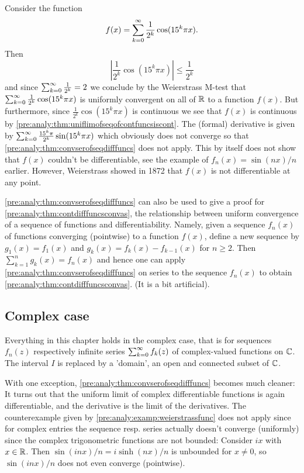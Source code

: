 \documentclass[10pt, a4paper]{article}
\newcommand{\infsumo}{\infsum[k = 0]}
\begin{document}
\begin{example}\label{pre:analy:examp:weierstrassfunc}
    Consider the function
    \[
    f(x) = \infsumo\frac{1}{2 ^ k}\cos(15 ^ k\pi x).
    \]
    Then
    \[
    \left|\frac{1}{2 ^ k}\cos(15 ^ k\pi x)\right| \leq \frac{1}{2 ^ k}
    \]
    and since $\infsumo\frac{1}{2 ^ k} = 2$ we conclude by the Weierstrass M-test that $\infsumo\frac{1}{2 ^ k}\cos(15 ^ k\pi x)$ is uniformly convergent on all of $\mathbb{R}$ to a function $f(x)$.
    But furthermore,
    since $\frac{1}{2 ^ k}\cos(15 ^ k\pi x)$ is continuous we see that $f(x)$ is continuous by \autoref{pre:analy:thm:uniflimofseqofcontfuncsiscont}.
    The
    (formal)
    derivative is given by $\infsumo\frac{15 ^ k\pi}{2 ^ k}\sin(15 ^ k\pi x)$ which obviously does not converge so that \autoref{pre:analy:thm:convserofseqdifffuncs} does not apply.
    This by itself does not show that $f(x)$ couldn't be differentiable,
    see the example of $f_n(x) = \sin(nx) / n$ earlier.
    However,
    Weierstrass showed in 1872 that $f(x)$ is not differentiable at any point.
\end{example}

\begin{remark}
    \autoref{pre:analy:thm:convserofseqdifffuncs} can also be used to give a proof for \autoref{pre:analy:thm:contdifffuncsconvas},
    the relationship between uniform convergence of a sequence of functions and differentiability.
    Namely,
    given a sequence $f_n(x)$ of functions converging
    (pointwise)
    to a function $f(x)$,
    define a new sequence by $g_1(x) = f_1(x)$ and $g_k(x) = f_k(x) - f_{k - 1}(x)$ for $n \geq 2$.
    Then $\sum_{k = 1}^{n}g_k(x) = f_n(x)$ and hence one can apply \autoref{pre:analy:thm:convserofseqdifffuncs} on series to the sequence $f_n(x)$ to obtain \autoref{pre:analy:thm:contdifffuncsconvas}.
    (It is a bit artificial).
\end{remark}

\subsection{Complex case}

Everything in this chapter holds in the complex case,
that is for sequences $f_n(z)$ respectively infinite series $\infsumo f_k(z)$ of complex-valued functions on $\mathbb{C}$.
The interval $I$ is replaced by a 'domain',
an open and connected subset of $\mathbb{C}$.

With one exception,
\autoref{pre:analy:thm:convserofseqdifffuncs} becomes much cleaner:
It turns out that the uniform limit of complex differentiable functions is again differentiable,
and the derivative is the limit of the derivatives.
The counterexample given by \autoref{pre:analy:examp:weierstrassfunc} does not apply since for complex entries the sequence resp. series actually doesn't converge
(uniformly)
since the complex trigonometric functions are not bounded:
Consider $ix$ with $x \in \mathbb{R}$.
Then $\sin(inx) / n = i\sinh(nx) / n$ is unbounded for $x \neq 0$,
so $\sin(inx) / n$ does not even converge
(pointwise).
\end{document}
